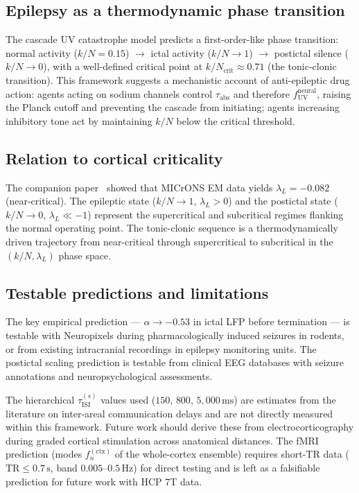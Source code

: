 \documentclass[aps,pre,twocolumn,showpacs,superscriptaddress,longbibliography]{revtex4-2}
\newcommand{\kN}{k/N}
\newcommand{\tauISI}{\tau_{\mathrm{ISI}}}
\newcommand{\tauabs}{\tau_{\mathrm{abs}}}
\newcommand{\fUV}{f_{\mathrm{UV}}}
\begin{document}
\subsection{Epilepsy as a thermodynamic phase transition}

The cascade UV catastrophe model predicts a first-order-like
phase transition: normal activity ($\kN = 0.15$) $\to$ ictal
activity ($\kN \to 1$) $\to$ postictal silence ($\kN \to 0$),
with a well-defined critical point at $\kN_{\mathrm{crit}}
\approx 0.71$ (the tonic-clonic transition). This framework
suggests a mechanistic account of anti-epileptic drug action:
agents acting on sodium channels control $\tauabs$ and therefore
$\fUV^{\mathrm{neural}}$, raising the Planck cutoff and
preventing the cascade from initiating; agents increasing
inhibitory tone act by maintaining $\kN$ below the critical
threshold.

\subsection{Relation to cortical criticality}

The companion paper~\cite{Santos2025a} showed that MICrONS EM
data yields $\lambda_L = -0.082$ (near-critical). The epileptic
state ($\kN \to 1$, $\lambda_L > 0$) and the postictal state
($\kN \to 0$, $\lambda_L \ll -1$) represent the supercritical
and subcritical regimes flanking the normal operating point.
The tonic-clonic sequence is a thermodynamically driven
trajectory from near-critical through supercritical to
subcritical in the $(\kN, \lambda_L)$ phase space.

\subsection{Testable predictions and limitations}

The key empirical prediction --- $\alpha \to -0.53$ in ictal
LFP before termination --- is testable with Neuropixels during
pharmacologically induced seizures in rodents, or from existing
intracranial recordings in epilepsy monitoring units. The
postictal scaling prediction is testable from clinical EEG
databases with seizure annotations and neuropsychological
assessments.

The hierarchical $\tauISI^{(s)}$ values used ($150$, $800$,
$5{,}000\,\mathrm{ms}$) are estimates from the literature on
inter-areal communication delays and are not directly measured
within this framework. Future work should derive these from
electrocorticography during graded cortical stimulation across
anatomical distances. The fMRI prediction (modes
$f_n^{(\mathrm{ctx})}$ of the whole-cortex ensemble) requires
short-TR data ($\mathrm{TR} \leq 0.7\,\mathrm{s}$, band
$0.005$--$0.5\,\mathrm{Hz}$) for direct testing and is left as
a falsifiable prediction for future work with HCP 7T data.
\end{document}
